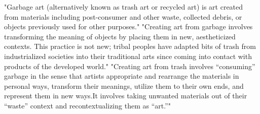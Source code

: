 "Garbage art (alternatively known as trash art or recycled art) is art created from materials including post-consumer and other waste, collected debris, or objects previously used for other purposes." "Creating art from garbage involves transforming the meaning of objects by placing them in new, aestheticized contexts. This practice is not new; tribal peoples have adapted bits of trash from industrialized societies into their traditional arts since coming into contact with products of the developed world." "Creating art from trash involves “consuming” garbage in the sense that artists appropriate and rearrange the materials in personal ways, transform their meanings, utilize them to their own ends, and represent them in new ways.It involves taking unwanted materials out of their “waste” context and recontextualizing them as “art.”" \cite{tauxe2012encyclopedia}





